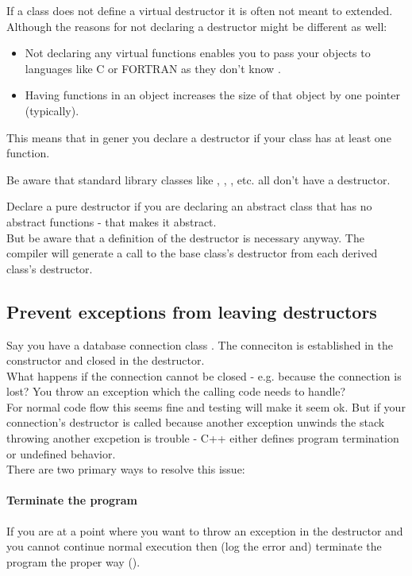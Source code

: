 \documentclass[a4paper, twocolumn]{article}
\let\oldsubsection\subsection
\newcounter{mysubsection}
\renewcommand{\subsection}{
    \stepcounter{mysubsection}
    \oldsubsection
}
\newcommand{\code}[1]{\texttt{\color{black}{#1}}}
\begin{document}
If a class does not define a virtual destructor it is often not meant to extended. Although the reasons for not declaring a \code{virtual} destructor might be different as well:
\begin{itemize}
	\item Not declaring any virtual functions enables you to pass your objects to languages like C or FORTRAN as they don't know \code{virtual}.
	\item Having \code{virtual} functions in an object increases the size of that object by one pointer (typically).
\end{itemize}
This means that in gener you declare a \code{virtual} destructor if your class has at least one \code{virtual} function.

Be aware that standard library classes like \code{string}, \code{vector}, \code{map}, etc. all don't have a \code{virtual} destructor.

Declare a pure \code{virtual} destructor if you are declaring an abstract class that has no abstract functions - that makes it abstract.\\
But be aware that a definition of the destructor is necessary anyway. The compiler will generate a call to the base class's destructor from each derived class's destructor.

\subsection{Prevent exceptions from leaving destructors} \label{ssec:ExceptionsInDtors}
Say you have a database connection class \code{DbConnection}. The conneciton is established in the constructor and closed in the destructor.\\
What happens if the connection cannot be closed - e.g. because the connection is lost? You throw an exception which the calling code needs to handle?\\
For normal code flow this seems fine and testing will make it seem ok. But if your connection's destructor is called because another exception unwinds the stack throwing another excpetion is trouble - C++ either defines program termination or undefined behavior.\\

There are two primary ways to resolve this issue:
\paragraph{Terminate the program}
If you are at a point where you want to throw an exception in the destructor and you cannot continue normal execution then (log the error and) terminate the program the proper way (\code{std::abort();}).
\end{document}
